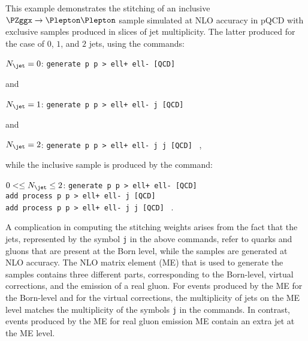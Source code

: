 This example demonstrates the stitching of an inclusive $\PZggx \to \Plepton\Plepton$ sample simulated at NLO accuracy in pQCD
with exclusive samples produced in slices of jet multiplicity.
The latter produced for the case of $0$, $1$, and $2$ jets, using the \MGvATNLO commands:
\begin{center}
$N_{\jet} = 0$: \quad \texttt{generate p p > ell+ ell- [QCD]}
\end{center}
and
\begin{center}
$N_{\jet} = 1$: \quad \texttt{generate p p > ell+ ell- j [QCD]}
\end{center}
and
\begin{center}
$N_{\jet} = 2$: \quad \texttt{generate p p > ell+ ell- j j [QCD]} \, ,
\end{center}
while the inclusive sample is produced by the command:
\begin{center}
$0 < \leq N_{\jet} \leq 2$: \quad \texttt{generate p p > ell+ ell- [QCD]} \\
\qquad \texttt{add process p p > ell+ ell- j [QCD]} \\
\qquad \texttt{add process p p > ell+ ell- j j [QCD]} \, .
\end{center}

A complication in computing the stitching weights arises from the fact that the jets, represented by the symbol \texttt{j} in the above commands,
refer to quarks and gluons that are present at the Born level, while the samples are generated at NLO accuracy.
The NLO matrix element (ME) that is used to generate the samples contains three different parts, 
corresponding to the Born-level, virtual corrections, and the emission of a real gluon.
For events produced by the ME for the Born-level and for the virtual corrections,
the multiplicity of jets on the ME level matches the multiplicity of the symbols \texttt{j} in the \MGvATNLO commands.
In contrast, events produced by the ME for real gluon emission ME contain an extra jet at the ME level.

